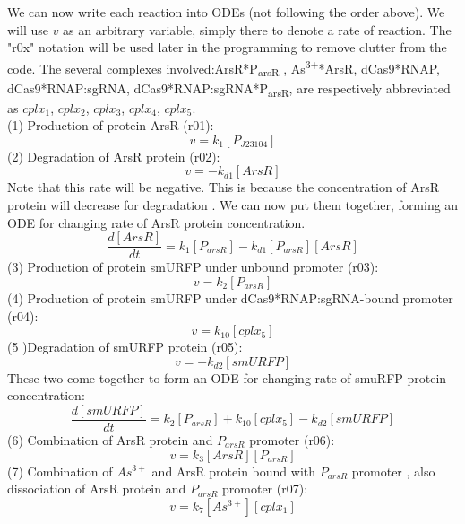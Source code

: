 We can now write each reaction into ODEs (not following the order above). We will use $v$ as an arbitrary variable, simply there to denote a rate of reaction. The "r0x" notation will be used later in the programming to remove clutter from the code. The several complexes involved:ArsR*P\textsubscript{arsR} , As\textsuperscript{3+}*ArsR, dCas9*RNAP, dCas9*RNAP:sgRNA, dCas9*RNAP:sgRNA*P\textsubscript{arsR}, are respectively abbreviated as $cplx_1$, $cplx_2$, $cplx_3$, $cplx_4$, $cplx_5$.\\
(1) Production of protein ArsR (r01):
\begin{displaymath}
v=k_1[P_{J23104}]
\end{displaymath}
(2) Degradation of ArsR protein (r02):
\begin{displaymath}
v=-k_{d1}[ArsR]
\end{displaymath}
Note that this rate will be negative. This is because the concentration of ArsR protein will decrease for degradation . We can now put them together, forming an ODE for changing rate of ArsR protein concentration.
\begin{equation}
\frac{d[ArsR]}{dt}=k_1[P_{arsR}]-k_{d1}[P_{arsR}][ArsR]\tag{1}
\end{equation}
(3) Production of protein smURFP under unbound promoter (r03):
\begin{displaymath}
v=k_2[P_{arsR}]
\end{displaymath}
(4) Production of protein smURFP under dCas9*RNAP:sgRNA-bound promoter (r04):
\begin{displaymath}
v=k_{10}[cplx_5]
\end{displaymath}
(5 )Degradation of smURFP protein (r05):
\begin{displaymath}
v=-k_{d2}[smURFP]
\end{displaymath}
These two come together to form an ODE for changing rate of smuRFP protein concentration:
\begin{equation}
\frac{d[smURFP]}{dt}=k_2[P_{arsR}]+k_{10}[cplx_5]-k_{d2}[smURFP]\tag{2}
\end{equation}
(6) Combination of ArsR protein and $P_{arsR}$ promoter (r06):
\begin{displaymath}
v=k_3[ArsR][P_{arsR}]
\end{displaymath}
(7) Combination of $As^{3+}$ and ArsR protein bound with $P_{arsR}$ promoter , also dissociation of ArsR protein and $P_{arsR}$ promoter (r07):
\begin{displaymath}
v=k_7[As^{3+}][cplx_1]
\end{displaymath}
